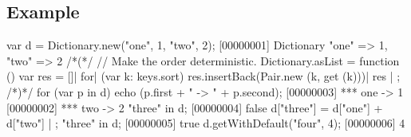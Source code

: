 \subsection{Example}

\begin{urbiscript}
var d = Dictionary.new("one", 1, "two", 2);
[00000001] Dictionary {"one" => 1, "two" => 2}
/*(*/
  // Make the order deterministic.
  Dictionary.asList =
  function ()
  {
    var res = []|
    for| (var k: keys.sort)
      res.insertBack(Pair.new (k, get (k)))|
    res
  } | {};
/*)*/
for (var p in d)
  echo (p.first + " -> " + p.second);
[00000003] *** one -> 1
[00000002] *** two -> 2
"three" in d;
[00000004] false
d["three"] = d["one"] + d["two"] | {};
"three" in d;
[00000005] true
d.getWithDefault("four", 4);
[00000006] 4
\end{urbiscript}

